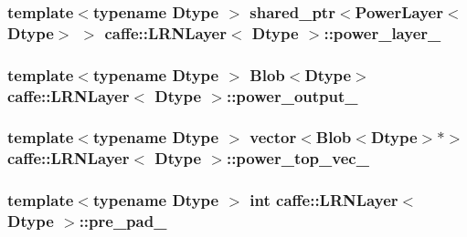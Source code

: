 \hypertarget{classcaffe_1_1_l_r_n_layer_a7d9446e995a4e4d1c27961159c1e7950}{
\subsubsection[{power\+\_\+layer\+\_\+}]{\setlength{\rightskip}{0pt plus 5cm}template$<$typename Dtype $>$ shared\+\_\+ptr$<${\bf Power\+Layer}$<$Dtype$>$ $>$ {\bf caffe\+::\+L\+R\+N\+Layer}$<$ Dtype $>$\+::power\+\_\+layer\+\_\+\hspace{0.3cm}{\ttfamily [protected]}}}\label{classcaffe_1_1_l_r_n_layer_a7d9446e995a4e4d1c27961159c1e7950}
\hypertarget{classcaffe_1_1_l_r_n_layer_adb51a5bb10b26a27835b2b19ecfe72b2}{
\subsubsection[{power\+\_\+output\+\_\+}]{\setlength{\rightskip}{0pt plus 5cm}template$<$typename Dtype $>$ {\bf Blob}$<$Dtype$>$ {\bf caffe\+::\+L\+R\+N\+Layer}$<$ Dtype $>$\+::power\+\_\+output\+\_\+\hspace{0.3cm}{\ttfamily [protected]}}}\label{classcaffe_1_1_l_r_n_layer_adb51a5bb10b26a27835b2b19ecfe72b2}
\hypertarget{classcaffe_1_1_l_r_n_layer_ac83227b50de568833235e7b2bdfbb8a8}{
\subsubsection[{power\+\_\+top\+\_\+vec\+\_\+}]{\setlength{\rightskip}{0pt plus 5cm}template$<$typename Dtype $>$ vector$<${\bf Blob}$<$Dtype$>$$\ast$$>$ {\bf caffe\+::\+L\+R\+N\+Layer}$<$ Dtype $>$\+::power\+\_\+top\+\_\+vec\+\_\+\hspace{0.3cm}{\ttfamily [protected]}}}\label{classcaffe_1_1_l_r_n_layer_ac83227b50de568833235e7b2bdfbb8a8}
\hypertarget{classcaffe_1_1_l_r_n_layer_a5d4a63f1279542a4fbe2780ba061f800}{
\subsubsection[{pre\+\_\+pad\+\_\+}]{\setlength{\rightskip}{0pt plus 5cm}template$<$typename Dtype $>$ int {\bf caffe\+::\+L\+R\+N\+Layer}$<$ Dtype $>$\+::pre\+\_\+pad\+\_\+\hspace{0.3cm}{\ttfamily [protected]}}}\label{classcaffe_1_1_l_r_n_layer_a5d4a63f1279542a4fbe2780ba061f800}
